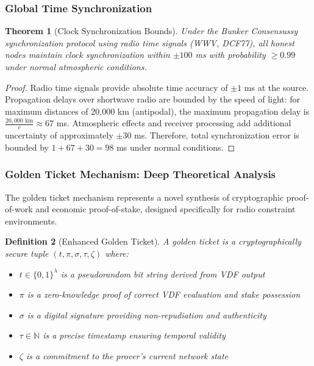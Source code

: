 \documentclass[11pt,a4paper]{article}
\newtheorem{theorem}{Theorem}[section]
\newtheorem{definition}[theorem]{Definition}
\begin{document}
\subsubsection{Global Time Synchronization}

\begin{theorem}[Clock Synchronization Bounds]
Under the Bunker Consensussy synchronization protocol using radio time signals (WWV, DCF77), all honest nodes maintain clock synchronization within $\pm 100$ ms with probability $\geq 0.99$ under normal atmospheric conditions.
\end{theorem}

\begin{proof}
Radio time signals provide absolute time accuracy of $\pm 1$ ms at the source. Propagation delays over shortwave radio are bounded by the speed of light: for maximum distances of 20,000 km (antipodal), the maximum propagation delay is $\frac{20,000 \text{ km}}{c} \approx 67$ ms. Atmospheric effects and receiver processing add additional uncertainty of approximately $\pm 30$ ms. Therefore, total synchronization error is bounded by $1 + 67 + 30 = 98$ ms under normal conditions.
\end{proof}

\subsubsection{Golden Ticket Mechanism: Deep Theoretical Analysis}

The golden ticket mechanism represents a novel synthesis of cryptographic proof-of-work and economic proof-of-stake, designed specifically for radio constraint environments.

\begin{definition}[Enhanced Golden Ticket]
A golden ticket is a cryptographically secure tuple $(t, \pi, \sigma, \tau, \zeta)$ where:
\begin{itemize}
\item $t \in \{0,1\}^{\lambda}$ is a pseudorandom bit string derived from VDF output
\item $\pi$ is a zero-knowledge proof of correct VDF evaluation and stake possession
\item $\sigma$ is a digital signature providing non-repudiation and authenticity
\item $\tau \in \mathbb{N}$ is a precise timestamp ensuring temporal validity
\item $\zeta$ is a commitment to the prover's current network state
\end{itemize}
\end{definition}
\end{document}
